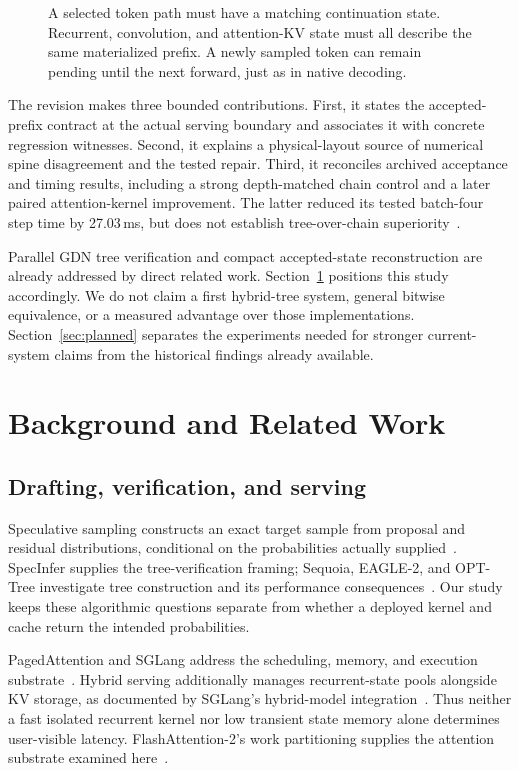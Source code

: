 \documentclass[conference]{IEEEtran}
\begin{document}
\begin{figure}[t]
\centering

\caption{A selected token path must have a matching continuation state. Recurrent, convolution, and attention-KV state must all describe the same materialized prefix. A newly sampled token can remain pending until the next forward, just as in native decoding.}
\label{fig:contract}
\end{figure}

The revision makes three bounded contributions. First, it states the accepted-prefix contract at the actual serving boundary and associates it with concrete regression witnesses. Second, it explains a physical-layout source of numerical spine disagreement and the tested repair. Third, it reconciles archived acceptance and timing results, including a strong depth-matched chain control and a later paired attention-kernel improvement. The latter reduced its tested batch-four step time by 27.03\,ms, but does not establish tree-over-chain superiority~\cite{lumo2026paired}.

Parallel GDN tree verification and compact accepted-state reconstruction are already addressed by direct related work. Section~\ref{sec:related} positions this study accordingly. We do not claim a first hybrid-tree system, general bitwise equivalence, or a measured advantage over those implementations. Section~\ref{sec:planned} separates the experiments needed for stronger current-system claims from the historical findings already available.

\section{Background and Related Work}
\label{sec:related}
\subsection{Drafting, verification, and serving}
Speculative sampling constructs an exact target sample from proposal and residual distributions, conditional on the probabilities actually supplied~\cite{leviathan2023fast,chen2023sampling}. SpecInfer supplies the tree-verification framing; Sequoia, EAGLE-2, and OPT-Tree investigate tree construction and its performance consequences~\cite{miao2023specinfer,chen2024sequoia,li2024eagle,wang2024opt}. Our study keeps these algorithmic questions separate from whether a deployed kernel and cache return the intended probabilities.

PagedAttention and SGLang address the scheduling, memory, and execution substrate~\cite{kwon2023efficient,zheng2024sglang}. Hybrid serving additionally manages recurrent-state pools alongside KV storage, as documented by SGLang's hybrid-model integration~\cite{pytorch2025sglang,sglang2026qwen}. Thus neither a fast isolated recurrent kernel nor low transient state memory alone determines user-visible latency. FlashAttention-2's work partitioning supplies the attention substrate examined here~\cite{dao2023flashattention}.
\end{document}
